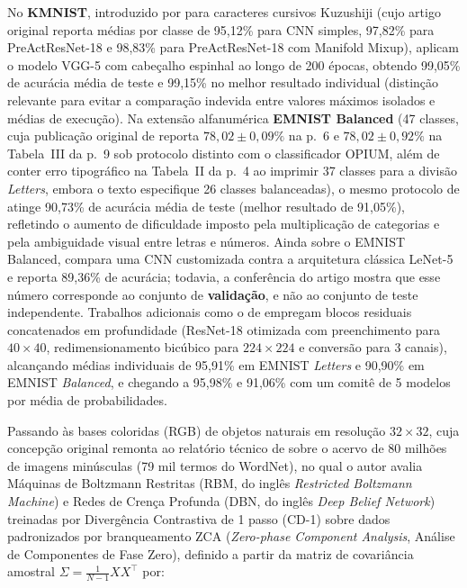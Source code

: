 \documentclass[
    12pt,
    openright,
    oneside,
    a4paper,
    english,
    brazil
]{abntex2}
\begin{document}
No \textbf{KMNIST}, introduzido por  para caracteres cursivos Kuzushiji (cujo artigo original reporta médias por classe de 95,12\% para CNN simples, 97,82\% para PreActResNet-18 e 98,83\% para PreActResNet-18 com Manifold Mixup),  aplicam o modelo VGG-5 com cabeçalho espinhal ao longo de 200 épocas, obtendo 99,05\% de acurácia média de teste e 99,15\% no melhor resultado individual (distinção relevante para evitar a comparação indevida entre valores máximos isolados e médias de execução). Na extensão alfanumérica \textbf{EMNIST Balanced} (47 classes, cuja publicação original de  reporta \(78{,}02 \pm 0{,}09\%\) na p.~6 e \(78{,}02 \pm 0{,}92\%\) na Tabela~III da p.~9 sob protocolo distinto com o classificador OPIUM, além de conter erro tipográfico na Tabela~II da p.~4 ao imprimir 37 classes para a divisão \textit{Letters}, embora o texto especifique 26 classes balanceadas), o mesmo protocolo de  atinge 90,73\% de acurácia média de teste (melhor resultado de 91,05\%), refletindo o aumento de dificuldade imposto pela multiplicação de categorias e pela ambiguidade visual entre letras e números. Ainda sobre o EMNIST Balanced,  compara uma CNN customizada contra a arquitetura clássica LeNet-5 \cite{lecun1998gradient} e reporta 89,36\% de acurácia; todavia, a conferência do artigo mostra que esse número corresponde ao conjunto de \textbf{validação}, e não ao conjunto de teste independente. Trabalhos adicionais como o de  empregam blocos residuais concatenados em profundidade (ResNet-18 otimizada com preenchimento para \(40 \times 40\), redimensionamento bicúbico para \(224 \times 224\) e conversão para 3 canais), alcançando médias individuais de 95,91\% em EMNIST \textit{Letters} e 90,90\% em EMNIST \textit{Balanced}, e chegando a 95,98\% e 91,06\% com um comitê de 5 modelos por média de probabilidades.

Passando às bases coloridas (RGB) de objetos naturais em resolução \(32 \times 32\), cuja concepção original remonta ao relatório técnico de  sobre o acervo de 80 milhões de imagens minúsculas (79 mil termos do WordNet), no qual o autor avalia Máquinas de Boltzmann Restritas (RBM, do inglês \textit{Restricted Boltzmann Machine}) e Redes de Crença Profunda (DBN, do inglês \textit{Deep Belief Network}) treinadas por Divergência Contrastiva de 1 passo (CD-1) sobre dados padronizados por branqueamento ZCA (\textit{Zero-phase Component Analysis}, Análise de Componentes de Fase Zero), definido a partir da matriz de covariância amostral \(\Sigma = \frac{1}{N-1} X X^\top\) por:
\end{document}
